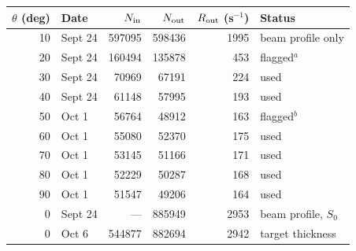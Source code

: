 \begin{tabular}{rlrrrl}
\hline\hline
$\theta$ (deg) & Date & $N_{\rm in}$ & $N_{\rm out}$ & $R_{\rm out}$ (s$^{-1}$) & Status\\
\hline
10 & Sept 24 & 597095 & 598436 & 1995 & beam profile only\\
20 & Sept 24 & 160494 & 135878 & 453 & flagged$^{a}$\\
30 & Sept 24 & 70969 & 67191 & 224 & used\\
40 & Sept 24 & 61148 & 57995 & 193 & used\\
50 & Oct 1 & 56764 & 48912 & 163 & flagged$^{b}$\\
60 & Oct 1 & 55080 & 52370 & 175 & used\\
70 & Oct 1 & 53145 & 51166 & 171 & used\\
80 & Oct 1 & 52229 & 50287 & 168 & used\\
90 & Oct 1 & 51547 & 49206 & 164 & used\\
0 & Sept 24 & --- & 885949 & 2953 & beam profile, $S_0$\\
0 & Oct 6 & 544877 & 882694 & 2942 & target thickness\\
\hline\hline
\end{tabular}
